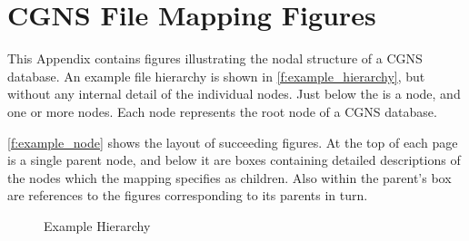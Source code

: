 \section{CGNS File Mapping Figures}
\label{s:figures}
\thispagestyle{plain}

This Appendix contains figures illustrating the nodal structure of
a CGNS database.
An example file hierarchy is shown in \autoref{f:example_hierarchy},
but without any internal detail of the individual nodes.
Just below the  is a  node, and
one or more  nodes.
Each  node represents the root node of a CGNS database.

\autoref{f:example_node} shows the layout of succeeding figures.
At the top of each page is a single parent node, and below it are boxes
containing detailed descriptions of the nodes which the mapping specifies
as children.
Also within the parent's box are references to the figures corresponding
to its parents in turn.

\renewcommand{\topfraction}{1.00}
\renewcommand{\bottomfraction}{1.00}
\renewcommand{\textfraction}{0.0}
\setlength{\unitlength}{1em}	%

\newlength{\indName}
\newlength{\indLabel}
\newlength{\indDimensions}
\newlength{\indDimensionValues}
\newlength{\indData}
\newlength{\indParameters}
\newlength{\indFunctions}
\newlength{\indChildNodes}
\newlength{\indbullet}
\newlength{\spacea}
\newlength{\spaceb}
\newlength{\spacec}
\settowidth{\indbullet}{\textbullet ~~}
\setlength{\spacea}{\indDimensionValues-\indChildNodes}
\setlength{\spaceb}{\indDimensions-\indParameters+5em}
\setlength{\spacec}{\indDimensions-\indFunctions+5em}

\newlength{\textmcap}
\setlength{\textmcap}{\textheight-\abovecaptionskip-\baselineskip}

\begin{landscape}
\begin{figure}[!htp]
\centering
\resizebox{\linewidth}{!}{}
\caption{Example Hierarchy}
\label{f:example_hierarchy}
\end{figure}
\end{landscape}

